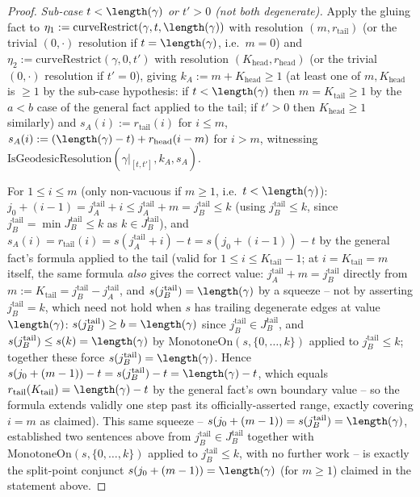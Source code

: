 \begin{proof}
  \emph{Sub-case $t<\length(\gamma)$ or $t'>0$ (not both degenerate).} Apply the gluing fact to
  $\eta_1:=\mathrm{curveRestrict}(\gamma,t,\length(\gamma))$ with resolution $(m,r_{\mathrm{tail}})$
  (or the trivial $(0,\cdot)$ resolution if $t=\length(\gamma)$, i.e.\ $m=0$) and
  $\eta_2:=\mathrm{curveRestrict}(\gamma,0,t')$ with resolution $(K_{\mathrm{head}},r_{\mathrm{head}})$
  (or the trivial $(0,\cdot)$ resolution if $t'=0$), giving $k_A:=m+K_{\mathrm{head}}\ge1$ (at least
  one of $m,K_{\mathrm{head}}$ is $\ge1$ by the sub-case hypothesis: if $t<\length(\gamma)$ then
  $m=K_{\mathrm{tail}}\ge1$ by the $a<b$ case of the general fact applied to the tail; if $t'>0$ then
  $K_{\mathrm{head}}\ge1$ similarly) and $s_A(i):=r_{\mathrm{tail}}(i)$ for $i\le m$,
  $s_A(i):=(\length(\gamma)-t)+r_{\mathrm{head}}(i-m)$ for $i>m$, witnessing
  $\mathrm{IsGeodesicResolution}(\gamma|_{[t,t']},k_A,s_A)$.

  For $1\le i\le m$ (only non-vacuous if $m\ge1$, i.e.\ $t<\length(\gamma)$): $j_0+(i-1)=
  j_A^{\mathrm{tail}}+i \le j_A^{\mathrm{tail}}+m = j_B^{\mathrm{tail}} \le k$ (using
  $j_B^{\mathrm{tail}}\le k$, since $j_B^{\mathrm{tail}}=\min J_B^{\mathrm{tail}}\le k$ as $k\in
  J_B^{\mathrm{tail}}$), and $s_A(i) = r_{\mathrm{tail}}(i) = s(j_A^{\mathrm{tail}}+i)-t =
  s(j_0+(i-1))-t$ by the general fact's formula applied to the tail (valid for $1\le i\le
  K_{\mathrm{tail}}-1$; at $i=K_{\mathrm{tail}}=m$ itself, the same formula \emph{also} gives the
  correct value: $j_A^{\mathrm{tail}}+m=j_B^{\mathrm{tail}}$ directly from $m:=K_{\mathrm{tail}}=
  j_B^{\mathrm{tail}}-j_A^{\mathrm{tail}}$, and $s(j_B^{\mathrm{tail}})=\length(\gamma)$ by a
  squeeze -- not by asserting $j_B^{\mathrm{tail}}=k$, which need not hold when $s$ has trailing
  degenerate edges at value $\length(\gamma)$: $s(j_B^{\mathrm{tail}})\ge b=\length(\gamma)$ since
  $j_B^{\mathrm{tail}}\in J_B^{\mathrm{tail}}$, and $s(j_B^{\mathrm{tail}})\le
  s(k)=\length(\gamma)$ by $\mathrm{MonotoneOn}(s,\{0,\dots,k\})$ applied to
  $j_B^{\mathrm{tail}}\le k$; together these force $s(j_B^{\mathrm{tail}})=\length(\gamma)$. Hence
  $s(j_0+(m-1))-t=s(j_B^{\mathrm{tail}})-t=\length(\gamma)-t$, which equals
  $r_{\mathrm{tail}}(K_{\mathrm{tail}})=\length(\gamma)-t$ by the general fact's own boundary value
  -- so the formula extends validly one step past its officially-asserted range, exactly covering
  $i=m$ as claimed). This same squeeze -- $s(j_0+(m-1))=s(j_B^{\mathrm{tail}})=\length(\gamma)$,
  established two sentences above from $j_B^{\mathrm{tail}}\in J_B^{\mathrm{tail}}$ together with
  $\mathrm{MonotoneOn}(s,\{0,\dots,k\})$ applied to $j_B^{\mathrm{tail}}\le k$, with no further work
  -- is exactly the split-point conjunct $s(j_0+(m-1))=\length(\gamma)$ (for $m\ge1$) claimed in the
  statement above.


\end{proof}
